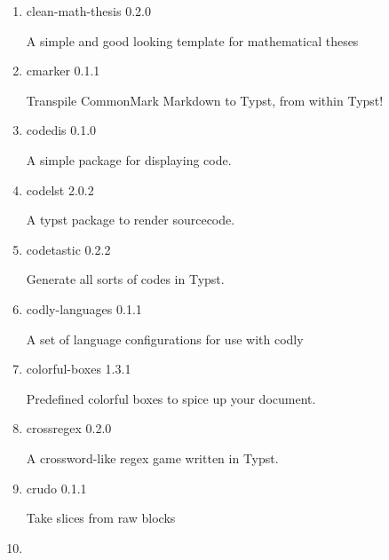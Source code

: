 \begin{enumerate}
  { clean-math-presentation } { 0.1.0 }

  A simple and good looking template for mathematical presentations
\item
  \href{/universe/package/clean-math-thesis/}{}


  { clean-math-thesis } { 0.2.0 }

  A simple and good looking template for mathematical theses
\item
  \href{/universe/package/cmarker/}{}

  { cmarker } { 0.1.1 }

  Transpile CommonMark Markdown to Typst, from within Typst!
\item
  \href{/universe/package/codedis/}{}

  { codedis } { 0.1.0 }

  A simple package for displaying code.
\item
  \href{/universe/package/codelst/}{}

  { codelst } { 2.0.2 }

  A typst package to render sourcecode.
\item
  \href{/universe/package/codetastic/}{}

  { codetastic } { 0.2.2 }

  Generate all sorts of codes in Typst.
\item
  \href{/universe/package/codly-languages/}{}

  { codly-languages } { 0.1.1 }

  A set of language configurations for use with codly
\item
  \href{/universe/package/colorful-boxes/}{}

  { colorful-boxes } { 1.3.1 }

  Predefined colorful boxes to spice up your document.
\item
  \href{/universe/package/crossregex/}{}

  { crossregex } { 0.2.0 }

  A crossword-like regex game written in Typst.
\item
  \href{/universe/package/crudo/}{}

  { crudo } { 0.1.1 }

  Take slices from raw blocks
\item
  \href{/universe/package/ctheorems/}{}


\end{enumerate}
